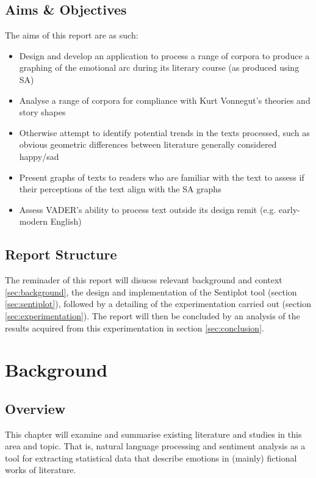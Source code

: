 \documentclass{article}
\begin{document}
    \subsection{Aims \& Objectives}
        The aims of this report are as such:
        \begin{itemize}
            \item Design and develop an application to process a range of corpora to produce a graphing of the emotional arc during its literary course (as produced using SA)
            \item Analyse a range of corpora for compliance with Kurt Vonnegut’s theories and story shapes
            \item Otherwise attempt to identify potential trends in the texts processed, such as obvious geometric differences between literature generally considered happy/sad
            \item Present graphs of texts to readers who are familiar with the text to assess if their perceptions of the text align with the SA graphs
            \item Assess VADER's ability to process text outside its design remit (e.g. early-modern English)
        \end{itemize}
    \subsection{Report Structure}
        The reminader of this report will disucss relevant background and context \ref{sec:background}, the design and implementation of the Sentiplot tool (section \ref{sec:sentiplot}), followed by a detailing of the experimentation carried out (section \ref{sec:experimentation}). The report will then be concluded by an analysis of the results acquired from this experimentation in section \ref{sec:conclusion}.
\newpage
\section{Background}
\label{sec:background)}
    \subsection{Overview}
        This chapter will examine and summarise existing literature and studies in this area and topic. That is, natural language processing and sentiment analysis as a tool for extracting statistical data that describe emotions in (mainly) fictional works of literature.
\end{document}

